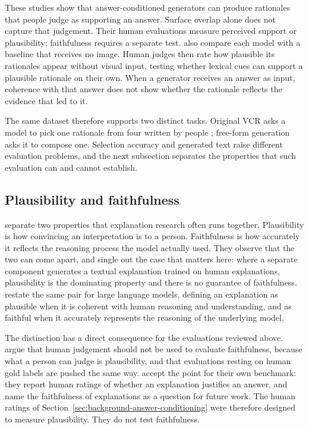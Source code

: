 These studies show that answer-conditioned generators can produce rationales that
people judge as supporting an answer. Surface overlap alone does not capture that
judgement. Their human evaluations measure perceived support or plausibility;
faithfulness requires a separate test. \citet{DBLP:conf/emnlp/MarasovicBPLSC20} also compare each model with a baseline
that receives no image. Human judges then rate how plausible its rationales
appear without visual input, testing whether lexical cues can support a plausible
rationale on their own. When a
generator receives an answer as input, coherence with that answer does not show
whether the rationale reflects the evidence that led to it.

The same dataset therefore supports two distinct tasks. Original VCR asks a
model to pick one rationale from four written by people
\citep{DBLP:conf/cvpr/ZellersBFC19}; free-form generation asks it to compose one.
Selection accuracy and generated text raise different evaluation problems, and the
next subsection separates the properties that such evaluation can and cannot
establish.

\subsection{Plausibility and faithfulness}
\label{sec:background-plausibility}

\citet{DBLP:conf/acl/JacoviG20} separate two properties that explanation research
often runs together. Plausibility is how convincing an interpretation is to a
person. Faithfulness is how accurately it reflects the reasoning process the model
actually used. They observe that the two can come apart, and single out the case
that matters here: where a separate component generates a textual explanation
trained on human explanations, plausibility is the dominating property and there is
no guarantee of faithfulness. \citet{DBLP:journals/corr/abs-2402-04614} restate the
same pair for large language models, defining an explanation as plausible when it
is coherent with human reasoning and understanding, and as faithful when it
accurately represents the reasoning of the underlying model.

The distinction has a direct consequence for the evaluations reviewed above.
\citet{DBLP:conf/acl/JacoviG20} argue that human judgement should not be used to
evaluate faithfulness, because what a person can judge is plausibility, and that
evaluations resting on human gold labels are pushed the same way.
\citet{KayserEtAl21EVIL} accept the point for their own benchmark: they report
human ratings of whether an explanation justifies an answer, and name the
faithfulness of explanations as a question for future work. The human ratings of
Section~\ref{sec:background-answer-conditioning} were therefore designed to
measure plausibility. They do not test faithfulness.

